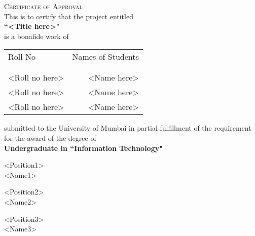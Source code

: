 \newpage
\thispagestyle{empty}

\begin{center}
    \Large \textsc {Certificate of Approval}\\[0.5cm]
    \normalsize This is to certify that the project entitled\\[0.5cm]
    \large \textbf {``<Title here>"}\\[0.5cm]
    \normalsize is a bonafide work of
\end{center}

\begin{table}[h]
    \centering
    \begin{tabular}{lr}
        Roll No        & Names of Students \\ \\ \hline
        \\
        <Roll no here> & <Name here>       \\
        <Roll no here> & <Name here>       \\
        <Roll no here> & <Name here>       \\
    \end{tabular}
\end{table}

\begin{center}
    submitted to the University of Mumbai in partial fulfillment of the requirement for the award of the degree of\\
    \vspace{.2in}
    \large \textbf {Undergraduate in ``Information Technology"}\\[0.5cm]
\end{center}

\vspace{.4in}
\begin{center}
    \begin{minipage}[b]{0.33333\textwidth}
        \raggedright
        <Position1>\\
        <Name1>
    \end{minipage}%
    \begin{minipage}[b]{0.33333\textwidth}
        \centering
        <Position2>\\
        <Name2>
    \end{minipage}%
    \begin{minipage}[b]{0.33333\textwidth}
        \raggedleft
        <Position3>\\
        <Name3>
    \end{minipage}
\end{center}